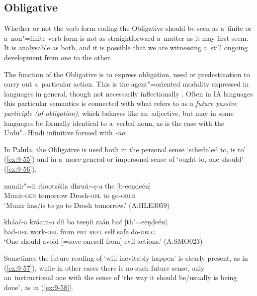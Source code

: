 \subsection{Obligative}
\label{subsec:9-2-3}

Whether or not the verb form coding the Obligative should be seen as a~finite or a~non"=finite verb form is not as straightforward a~matter as it may first seem. It is analysable as both, and it is possible that we are witnessing a~still ongoing development from one to the other. 



The function of the Obligative is to express obligation, need or predestination to carry out a~particular action. This is the agent"=oriented modality expressed in languages in general, though not necessarily inflectionally \citep[177--187]{bybeeetal1994}. Often in IA languages this particular semantics is connected with what \citet[322]{masica1991} refers to as a \textit{future passive participle (of obligation)}, which behaves like an~adjective, but may in some languages be formally identical to a~verbal noun, as is the case with the Urdu"=Hindi infinitive formed with \textit{-nā}. 



In Palula, the Obligative is used both in the personal sense `scheduled to, is to' (\ref{ex:9-55}) and in a~more general or impersonal sense of `ought to, one should' (\ref{ex:9-56}).

\begin{exe}
\ex
\label{ex:9-55}
\gll muníir"=ii rhootašíia dhruú$\sim$ṣ-a the [b-eeṇḍeéu] \\
Munir-\textsc{gen } tomorrow Drosh-\textsc{obl} to go-\textsc{oblg} \\
\glt `Munir has/is to go to Drosh tomorrow.' (A:HLE3059)

\ex
\label{ex:9-56}
\gll kháač-a kráam-a díi ba teeṇíi zaán bač [th"=eeṇḍeéu] \\
bad-\textsc{obl} work-\textsc{obl} from \textsc{prt} \textsc{refl} self safe do-\textsc{oblg} \\
\glt `One should avoid [=save oneself from] evil actions.' (A:SMO023)
\end{exe}

Sometimes the future reading of `will inevitably happen' is clearly present, as in (\ref{ex:9-57}), while in other cases there is no such future sense, only an~instructional one with the sense of `the way it should be/usually is being done', as in (\ref{ex:9-58}).

